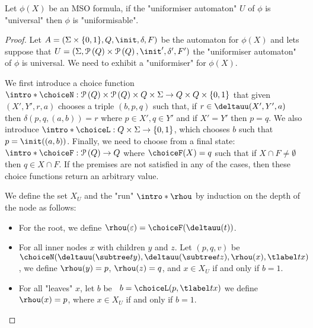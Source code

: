 \documentclass[a4paper,UKenglish,cleveref, autoref, thm-restate]{lipics-v2021}
\begin{document}
\begin{lemma}
	Let $\phi(X)$ be an MSO formula, if the "uniformiser automaton" $U$ of $\phi$ is "universal" then $\phi$ is "uniformisable".
\end{lemma}

\begin{proof}
	Let $A =  (\Sigma \times \{0,1\}, Q, \init, \delta, F)$ be the automaton for $\phi(X)$ and lets suppose that
	$U = (\Sigma, \parts Q \times \parts Q,\init', \delta', F')$ the "uniformiser automaton" of $\phi$ is universal.
	We need to exhibit a "uniformiser" for $\phi(X)$.

	We first introduce a choice function $\intro*\choiceN : \parts Q \times \parts Q \times Q \times \Sigma \to Q \times Q \times \set{0,1}$
	that given $(X',Y',r,a)$ chooses a triple $(b,p,q)$ such that, if $r \in \deltauu(X',Y', a)$ then $\delta(p,q,(a,b)) = r$ where $p \in X', q \in Y'$
	and if $X' = Y'$ then $p = q$.
	We also introduce $\intro* \choiceL : Q \times \Sigma \to \set{0,1} $, which chooses
	$b$ such that $p = \init((a,b))$.
	Finally, we need to choose from a final state: $\intro* \choiceF : \parts Q \to  Q$ where
	$\choiceF (X) = q$ such that if $X \cap F \neq \emptyset$ then $q \in X \cap F$. If the premises are not satisfied in any of the cases, then
	these choice functions return an arbitrary value.

	We define the set $X_U$ and the "run" $\intro*\rhou$  by induction on the depth of the node as follows:
	\begin{itemize}
		\item For the root, we define $\rhou(\varepsilon) = \choiceF(\deltauu(t))$.
		\item For all inner nodes $x$ with children $y$ and $z$. Let $(p,q,v)$ be~$\choiceN(\deltauu(\subtree t y), \deltauu(\subtree t z), \rhou(x), \tlabel t x)$, we define
		      $\rhou(y)=p$, $\rhou(z)=q$, and $x \in X_U$ if and only if $b = 1$.
		\item For all "leaves" $x$, let $b$ be ~$b = \choiceL(p, \tlabel t x)$ we define $\rhou (x) = p$, where $x \in X_U$ if and only if $b = 1$.
	\end{itemize}


\end{proof}
\end{document}
